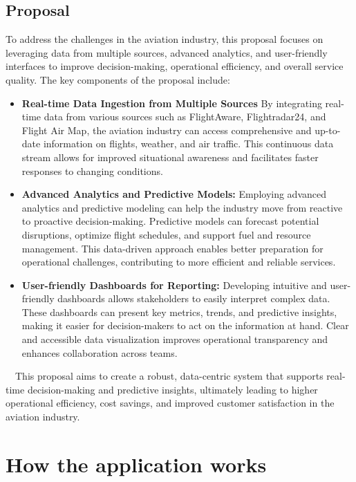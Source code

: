 \documentclass[12pt, a4paper]{article}
\begin{document}
\subsection{Proposal}
To address the challenges in the aviation industry, this proposal focuses on
leveraging data from multiple sources, advanced analytics, and user-friendly
interfaces to improve decision-making, operational efficiency, and overall
service quality. The key components of the proposal include:
    \begin{itemize}
        \item \textbf{Real-time Data Ingestion from Multiple Sources} By
        integrating real-time data from various sources such as FlightAware,
        Flightradar24, and Flight Air Map, the aviation industry can access
        comprehensive and up-to-date information on flights, weather, and air
        traffic. This continuous data stream allows for improved situational
        awareness and facilitates faster responses to changing conditions.
        \item \textbf{Advanced Analytics and Predictive Models:} Employing
        advanced analytics and predictive modeling can help the industry move
        from reactive to proactive decision-making. Predictive models can
        forecast potential disruptions, optimize flight schedules, and support
        fuel and resource management. This data-driven approach enables better
        preparation for operational challenges, contributing to more efficient
        and reliable services.
        \item \textbf{User-friendly Dashboards for Reporting:} Developing
        intuitive and user-friendly dashboards allows stakeholders to easily
        interpret complex data. These dashboards can present key metrics,
        trends, and predictive insights, making it easier for decision-makers to
        act on the information at hand. Clear and accessible data visualization
        improves operational transparency and enhances collaboration across
        teams.
    \end{itemize}
    $\quad$This proposal aims to create a robust, data-centric system that
    supports real-time decision-making and predictive insights, ultimately
    leading to higher operational efficiency, cost savings, and improved
    customer satisfaction in the aviation industry.

\section{How the application works}
\end{document}
